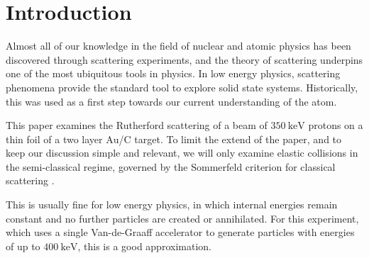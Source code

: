 \section{Introduction} 
Almost all of our knowledge in the field of nuclear and atomic physics has been discovered through scattering experiments, and the theory of scattering underpins one of the most ubiquitous tools in physics.
In low energy physics, scattering phenomena provide the standard tool to
explore solid state systems. Historically, this was used as a first step
towards our current understanding of the atom.

This paper examines the Rutherford scattering of a beam of
$\SI{350}{\kilo\electronvolt}$ protons on a thin foil of
a two layer $\mathrm{Au}$/$\mathrm{C}$ target. To limit the extend of the paper, and to
keep our discussion simple and relevant, we will only examine elastic
collisions in the semi-classical regime, governed by the Sommerfeld criterion
for classical scattering \parencite[p. 14]{noteBB}.

This is usually fine for low energy physics, in which internal energies remain
constant and no further particles are created or annihilated.
For this experiment, which uses a single Van-de-Graaff accelerator to generate particles with energies of up to $\SI{400}{\kilo\electronvolt}$, this is a good approximation.
